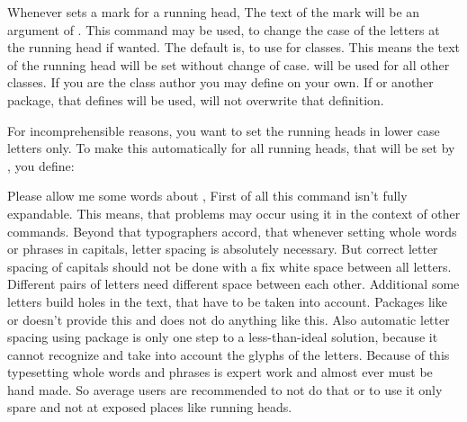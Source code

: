 \begin{Declaration}
\end{Declaration}
%
Whenever  sets a mark for a running head, The text of the
mark will be an argument of . This command may be used, to
change the case of the letters at the running head if wanted. The default is,
to use
 for
\KOMAScript{} classes. This means the text of the running head will be set
without change of case.
will be used for all other classes. If you are the class author you may define
 on your own. If  or another package,
that defines  will be used,  will not
overwrite that definition.
\begin{Example}
  For incomprehensible reasons, you want to set the running heads in lower
  case letters only. To make this automatically for all running heads, that
  will be set by , you define:
\begin{lstcode}
  \let\MakeMarkcase\MakeLowercase
\end{lstcode}
\end{Example}
Please allow me some words about
, First of all this command isn't
fully expandable. This means, that problems may occur using it in the context
of other commands. Beyond that typographers accord, that whenever setting
whole words or phrases in capitals, letter spacing is absolutely
necessary. But correct letter spacing of capitals should not be done with a
fix white space between all letters. Different pairs of letters need different
space between each other. Additional some letters build holes in the text,
that have to be taken into account. Packages like  or
 doesn't provide this and  does not do
anything like this. Also automatic letter spacing using package
 is only one step to a less-than-ideal solution, because it
cannot recognize and take into account the glyphs of the letters. Because of
this typesetting whole words and phrases is expert work
and almost ever must be hand made. So average users are recommended to not do
that or to use it only spare and not at exposed places like running heads.%
%

